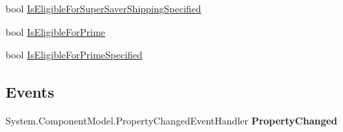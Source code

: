 \begin{DoxyCompactItemize}
\begin{DoxyCompactList}\small\item\em \end{DoxyCompactList}\item 
\hypertarget{class_amazon___price___finder_1_1amazon_1_1ecs_1_1_offer_listing_aeb3cf9f25dd4b9c734c2dc403f8057aa}{bool \hyperlink{class_amazon___price___finder_1_1amazon_1_1ecs_1_1_offer_listing_aeb3cf9f25dd4b9c734c2dc403f8057aa}{Is\-Eligible\-For\-Super\-Saver\-Shipping\-Specified}}\label{class_amazon___price___finder_1_1amazon_1_1ecs_1_1_offer_listing_aeb3cf9f25dd4b9c734c2dc403f8057aa}

\begin{DoxyCompactList}\small\item\em \end{DoxyCompactList}\item 
\hypertarget{class_amazon___price___finder_1_1amazon_1_1ecs_1_1_offer_listing_a4554cec16696985263702d20577f71d3}{bool \hyperlink{class_amazon___price___finder_1_1amazon_1_1ecs_1_1_offer_listing_a4554cec16696985263702d20577f71d3}{Is\-Eligible\-For\-Prime}}\label{class_amazon___price___finder_1_1amazon_1_1ecs_1_1_offer_listing_a4554cec16696985263702d20577f71d3}

\begin{DoxyCompactList}\small\item\em \end{DoxyCompactList}\item 
\hypertarget{class_amazon___price___finder_1_1amazon_1_1ecs_1_1_offer_listing_ab7c7ea3e6dc63ab8ed16f1c18c3bf6b3}{bool \hyperlink{class_amazon___price___finder_1_1amazon_1_1ecs_1_1_offer_listing_ab7c7ea3e6dc63ab8ed16f1c18c3bf6b3}{Is\-Eligible\-For\-Prime\-Specified}}\label{class_amazon___price___finder_1_1amazon_1_1ecs_1_1_offer_listing_ab7c7ea3e6dc63ab8ed16f1c18c3bf6b3}

\begin{DoxyCompactList}\small\item\em \end{DoxyCompactList}\end{DoxyCompactItemize}
\subsection*{Events}
\begin{DoxyCompactItemize}
\item 
\hypertarget{class_amazon___price___finder_1_1amazon_1_1ecs_1_1_offer_listing_a62c4931a42c98baec1b0122fc27a9e57}{System.\-Component\-Model.\-Property\-Changed\-Event\-Handler {\bfseries Property\-Changed}}\label{class_amazon___price___finder_1_1amazon_1_1ecs_1_1_offer_listing_a62c4931a42c98baec1b0122fc27a9e57}

\end{DoxyCompactItemize}


